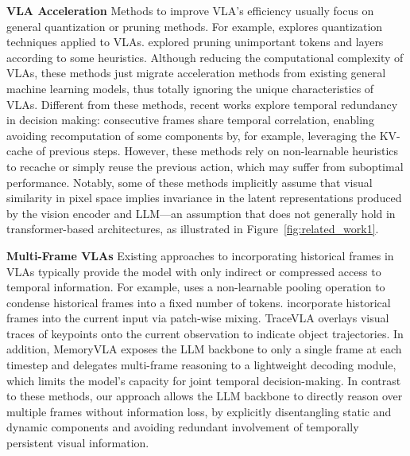 \noindent\textbf{VLA Acceleration}
Methods to improve VLA's efficiency usually focus on general quantization or pruning methods. For example, \citet{kim2024openvla,reddy2019sqilimitationlearningreinforcement,park2024quantizationawareimitationlearningresourceefficientrobotic} explores quantization techniques applied to VLAs. \citet{shukor2025smolvlavisionlanguageactionmodelaffordable,yang2025efficientvla,zhang2025mole,yue2024deer} explored pruning unimportant tokens and layers according to some heuristics. Although reducing the computational complexity of VLAs, these methods just migrate acceleration methods from existing general machine learning models, thus totally ignoring the unique characteristics of VLAs. Different from these methods, recent works \citep{xu2025vla,liu2025ttf,tan2025think} explore temporal redundancy in decision making: consecutive frames share temporal correlation, enabling avoiding recomputation of some components by, for example, leveraging the KV-cache of previous steps. However, these methods rely on non-learnable heuristics to recache or simply reuse the previous action, which may suffer from suboptimal performance. Notably, some of these methods \citep{xu2025vla,liu2025ttf} implicitly assume that visual similarity in pixel space implies invariance in the latent representations produced by the vision encoder and LLM—an assumption that does not generally hold in transformer-based architectures, as illustrated in Figure~\ref{fig:related_work1}.

\noindent\textbf{Multi-Frame VLAs}
Existing approaches to incorporating historical frames in VLAs typically provide the model with only indirect or compressed access to temporal information. For example, \citet{jang2025contextvla} uses a non-learnable pooling operation to condense historical frames into a fixed number of tokens. \citet{liu2025ttf,torne2026mem} incorporate historical frames into the current input via patch-wise mixing. TraceVLA \citep{zheng2024tracevla} overlays visual traces of keypoints onto the current observation to indicate object trajectories. In addition, MemoryVLA \citep{shi2025memoryvlaperceptualcognitivememoryvisionlanguageaction} exposes the LLM backbone to only a single frame at each timestep and delegates multi-frame reasoning to a lightweight decoding module, which limits the model’s capacity for joint temporal decision-making. In contrast to these methods, our approach allows the LLM backbone to directly reason over multiple frames without information loss, by explicitly disentangling static and dynamic components and avoiding redundant involvement of temporally persistent visual information.